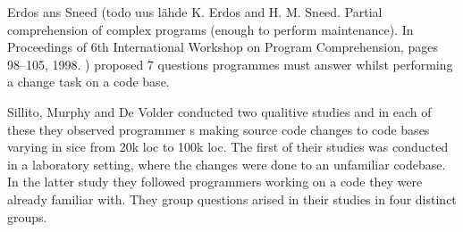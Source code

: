 \documentclass[finnish]{../tktltiki2}
\theoremstyle{definition}
\theoremstyle{remark}
\begin{document}
Erdos ans Sneed (todo uus lähde  K. Erdos and H. M. Sneed. Partial comprehension of complex programs (enough to perform maintenance). In Proceedings of 6th International Workshop on Program Comprehension, pages 98–105, 1998. ) proposed 7 questions programmes must answer whilst performing a change task on a code base.

Sillito, Murphy and De Volder conducted two qualitive studies and in each of these they observed programmer s making source code changes to code bases varying in sice from 20k loc to 100k loc.
The first of their studies was conducted in a laboratory setting, where the changes were done to an unfamiliar codebase. In the latter study they followed programmers working on a code they were already familiar with.
They group questions arised in their studies in four distinct groups.
\end{document}
